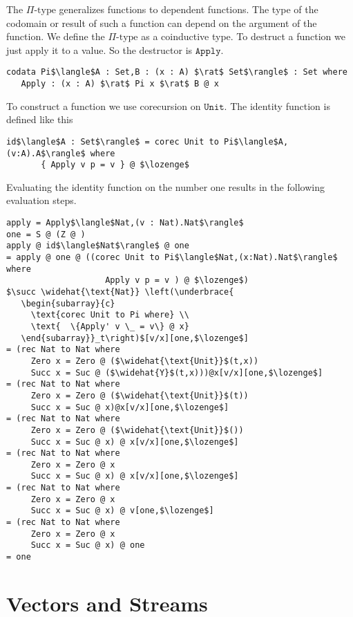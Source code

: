 \documentclass[a4paper,cleardoubleempty,BCOR1cm]{scrbook}
\begin{document}
The \(\Pi\text{-type}\) generalizes functions to dependent functions. The type of
the codomain or result of such a function can depend on the argument of the
function. We define the \(\Pi\text{-type}\) as a coinductive type. To destruct a
function we just apply it to a value. So the destructor is $\mathtt{Apply}$.

\begin{lstlisting}
codata Pi$\langle$A : Set,B : (x : A) $\rat$ Set$\rangle$ : Set where
   Apply : (x : A) $\rat$ Pi x $\rat$ B @ x
\end{lstlisting}

To construct a function we use corecursion on $\mathtt{Unit}$. The identity function
is defined like this
\begin{lstlisting}
id$\langle$A : Set$\rangle$ = corec Unit to Pi$\langle$A,(v:A).A$\rangle$ where
       { Apply v p = v } @ $\lozenge$
\end{lstlisting}

Evaluating the identity function on the number one results in the following
evaluation steps.

\begin{lstlisting}
apply = Apply$\langle$Nat,(v : Nat).Nat$\rangle$
one = S @ (Z @ )
apply @ id$\langle$Nat$\rangle$ @ one
= apply @ one @ ((corec Unit to Pi$\langle$Nat,(x:Nat).Nat$\rangle$ where
                    Apply v p = v ) @ $\lozenge$)
$\succ \widehat{\text{Nat}} \left(\underbrace{
   \begin{subarray}{c}
     \text{corec Unit to Pi where} \\
     \text{  \{Apply' v \_ = v\} @ x}
   \end{subarray}}_t\right)$[v/x][one,$\lozenge$]
= (rec Nat to Nat where
     Zero x = Zero @ ($\widehat{\text{Unit}}$(t,x))
     Succ x = Suc @ ($\widehat{Y}$(t,x)))@x[v/x][one,$\lozenge$]
= (rec Nat to Nat where
     Zero x = Zero @ ($\widehat{\text{Unit}}$(t))
     Succ x = Suc @ x)@x[v/x][one,$\lozenge$]
= (rec Nat to Nat where
     Zero x = Zero @ ($\widehat{\text{Unit}}$())
     Succ x = Suc @ x) @ x[v/x][one,$\lozenge$]
= (rec Nat to Nat where
     Zero x = Zero @ x
     Succ x = Suc @ x) @ x[v/x][one,$\lozenge$]
= (rec Nat to Nat where
     Zero x = Zero @ x
     Succ x = Suc @ x) @ v[one,$\lozenge$]
= (rec Nat to Nat where
     Zero x = Zero @ x
     Succ x = Suc @ x) @ one
= one
\end{lstlisting}

\section{Vectors and Streams}
\label{sec:orga00046d}
\end{document}
